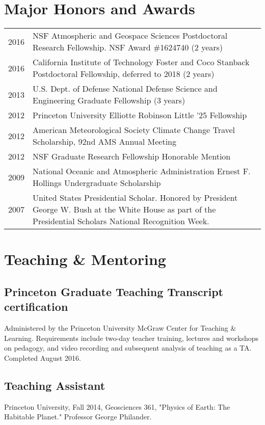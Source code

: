 \documentclass[12pt,letterpaper]{shillcv}
\begin{document}
\section*{Major Honors and Awards}
\label{sec:org3cc426d}
\begin{center}
\begin{tabularx}{\textwidth}{lX}
2016 & NSF Atmospheric and Geospace Sciences Postdoctoral Research Fellowship.  NSF Award \#1624740 (2 years)\\
2016 & California Institute of Technology Foster and Coco Stanback Postdoctoral Fellowship, deferred to 2018 (2 years)\\
2013 & U.S. Dept. of Defense National Defense Science and Engineering Graduate Fellowship (3 years)\\
2012 & Princeton University Elliotte Robinson Little '25 Fellowship\\
2012 & American Meteorological Society Climate Change Travel Scholarship, 92nd AMS Annual Meeting\\
2012 & NSF Graduate Research Fellowship Honorable Mention\\
2009 & National Oceanic and Atmospheric Administration Ernest F. Hollings Undergraduate Scholarship\\
2007 & United States Presidential Scholar.  Honored by President George W. Bush at the White House as part of the Presidential Scholars National Recognition Week.\\
\end{tabularx}
\end{center}
\section*{Teaching \& Mentoring}
\label{sec:orgd8befe7}
\subsection*{Princeton Graduate Teaching Transcript certification}
\label{sec:org7a2d41e}
Administered by the Princeton University McGraw Center for Teaching \& Learning.
Requirements include two-day teacher training, lectures and workshops on
pedagogy, and video recording and subsequent analysis of teaching as a TA.
Completed August 2016.
\subsection*{Teaching Assistant}
\label{sec:org574c54c}
Princeton University, Fall 2014, Geosciences 361, "Physics of Earth: The
Habitable Planet."  Professor George Philander.
\end{document}
